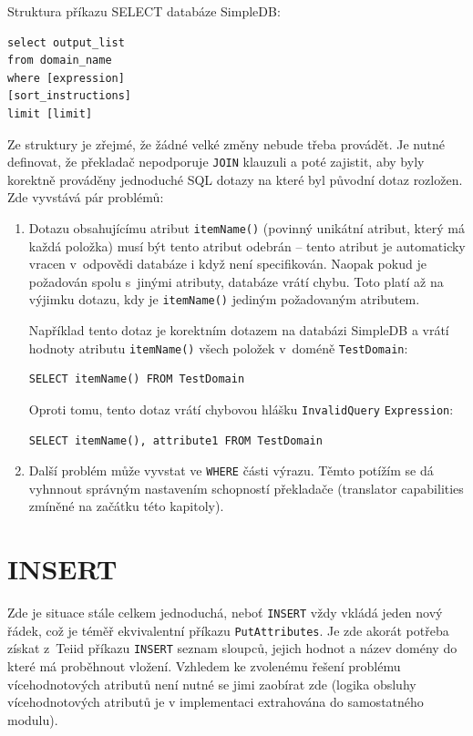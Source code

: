 \documentclass[oneside,12pt]{fithesis2}
\begin{document}
Struktura příkazu SELECT databáze SimpleDB:
\begin{Verbatim}[frame=leftline,fontsize=\small]
select output_list
from domain_name
where [expression]
[sort_instructions]
limit [limit] 
\end{Verbatim}
Ze struktury je zřejmé, že žádné velké změny nebude třeba provádět. Je nutné definovat, že překladač nepodporuje \verb<JOIN< klauzuli a poté zajistit, aby byly korektně prováděny jednoduché SQL dotazy na které byl původní dotaz rozložen. Zde vyvstává pár problémů:
\begin{enumerate}
 \item Dotazu obsahujícímu atribut \verb<itemName()< (povinný unikátní atribut, který má každá položka) musí být tento atribut odebrán -- tento atribut je automaticky vracen v~odpovědi databáze i když není specifikován. Naopak pokud je požadován spolu s~jinými atributy, databáze vrátí chybu. Toto platí až na výjimku dotazu, kdy je \verb<itemName()< jediným požadovaným atributem.
 
 Například tento dotaz je korektním dotazem na databázi SimpleDB a vrátí hodnoty atributu \verb<itemName()< všech položek v~doméně \verb<TestDomain<:
 \begin{Verbatim}[fontsize=\small]
SELECT itemName() FROM TestDomain
  \end{Verbatim}
 Oproti tomu, tento dotaz vrátí chybovou hlášku \verb<InvalidQuery< \verb<Expression<:
  \begin{Verbatim}[fontsize=\small]
SELECT itemName(), attribute1 FROM TestDomain
  \end{Verbatim}
 \item Další problém může vyvstat ve \texttt{WHERE} části výrazu. Těmto potížím se dá vyhnnout správným nastavením schopností překladače (translator capabilities zmíněné na začátku této kapitoly). 
\end{enumerate}

\section{INSERT}
Zde je situace stále celkem jednoduchá, neboť \verb<INSERT< vždy vkládá jeden nový řádek, což je téměř ekvivalentní příkazu \verb<PutAttributes<. Je zde akorát potřeba získat z~Teiid příkazu \verb<INSERT< seznam sloupců, jejich hodnot a název domény do které má proběhnout vložení. Vzhledem ke zvolenému řešení problému vícehodnotových atributů není nutné se jimi zaobírat zde (logika obsluhy vícehodnotových atributů je v implementaci extrahována do samostatného modulu).
\end{document}
